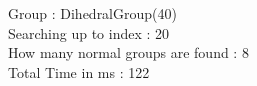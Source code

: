 Group : DihedralGroup(40)\\
Searching up to index : 20\\
How many normal groups are found : 8\\
Total Time in ms : 122\\
